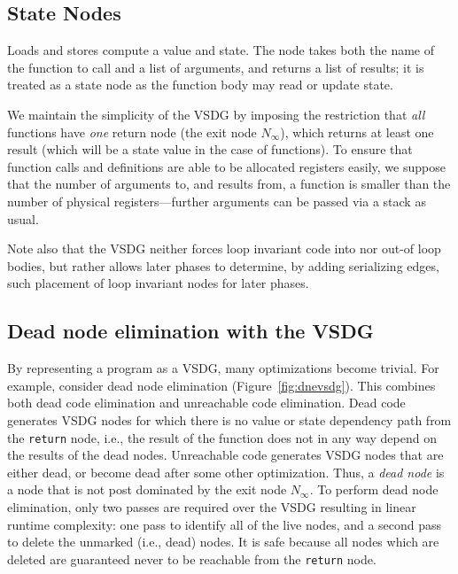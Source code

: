 
\subsection{State Nodes}
Loads and stores compute a value and state. 
The  node takes both the name of the function to call and a list of arguments, and returns a list of results; 
it is treated as a state node as the function body may read or update state.

\medskip

We maintain the simplicity of the VSDG by imposing the restriction that \emph{all} functions have \emph{one} return node (the exit node $N_\infty$), which returns at least one result (which will be a state value in the case of  functions). 
To ensure that function calls and definitions are able to be allocated registers easily, we suppose that the number of arguments to, and results from, a function is smaller than the number of physical registers---further arguments can be passed via a stack as usual.

Note also that the VSDG neither forces loop invariant code into nor out-of loop bodies, but rather allows later phases to determine, by adding serializing edges, such placement of loop invariant nodes for later phases.

\subsection{Dead node elimination with the VSDG}
By representing a program as a VSDG, many optimizations become trivial. 
For example, consider dead node elimination (Figure~\ref{fig:dnevsdg}). 
This combines both dead code elimination and unreachable code elimination. 
Dead code generates VSDG nodes for which there is no value or state dependency path from the \texttt{return} node, i.e., the result of the function does not in any way depend on the results of the dead nodes. 
Unreachable code generates VSDG nodes that are either dead, or become dead after some other optimization. 
Thus, a \textit{dead node} is a node that is not post dominated by the exit node $N_{\infty}$. 
To perform dead node elimination, only two passes are required over the VSDG resulting in linear runtime complexity: 
one pass to identify all of the live nodes, and a second pass to delete the unmarked (i.e., dead) nodes. 
It is safe because all nodes which are deleted are guaranteed never to be reachable from the \texttt{return} node.

